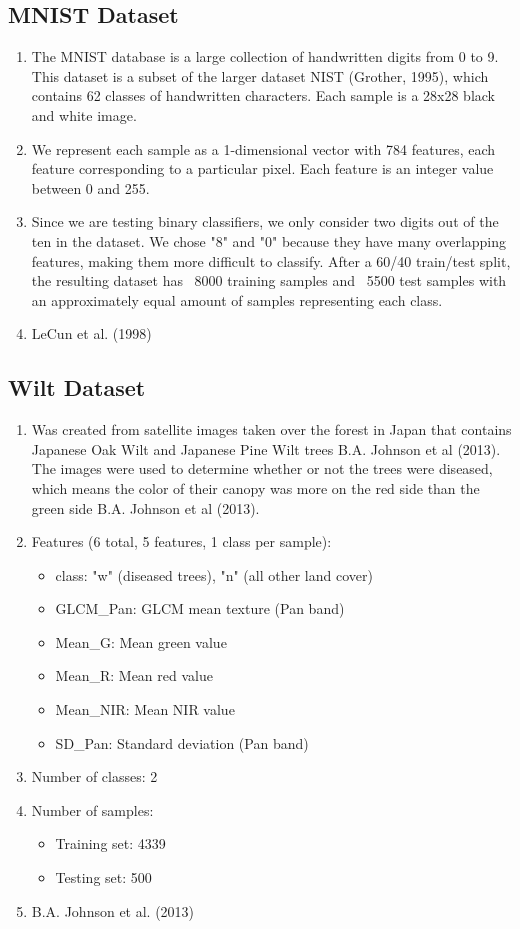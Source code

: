 \documentclass[letterpaper, 11pt]{article}
\begin{document}
\subsection{MNIST Dataset}
\begin{enumerate}
    \item The MNIST database is a large collection of handwritten digits from 0 to 9. This dataset is a subset of the larger dataset NIST (Grother, 1995), which contains 62 classes of handwritten characters. Each sample is a 28x28 black and white image.
    \item We represent each sample as a 1-dimensional vector with 784 features, each feature corresponding to a particular pixel. Each feature is an integer value between 0 and 255.
    \item Since we are testing binary classifiers, we only consider two digits out of the ten in the dataset. We chose "8" and "0" because they have many overlapping features, making them more difficult to classify. After a 60/40 train/test split, the resulting dataset has ~8000 training samples and ~5500 test samples with an approximately equal amount of samples representing each class.
    \item LeCun et al. (1998)
\end{enumerate}

\subsection{Wilt Dataset}
\begin{enumerate}
    \item Was created from  satellite images taken over the forest in Japan that contains Japanese Oak Wilt and Japanese Pine Wilt trees B.A. Johnson et al (2013). The images were used to determine whether or not the trees were diseased, which means the color of their canopy was more on the red side than the green side B.A. Johnson et al (2013).
    \item Features (6 total, 5 features, 1 class per sample):
    \begin{itemize}
        \item class: "w" (diseased trees), "n" (all other land cover)
        \item GLCM\_Pan: GLCM mean texture (Pan band)
        \item Mean\_G: Mean green value
        \item Mean\_R: Mean red value
        \item Mean\_NIR: Mean NIR value
        \item SD\_Pan: Standard deviation (Pan band)
    \end{itemize}
    \item Number of classes: 2
    \item Number of samples:
    \begin{itemize}
        \item Training set: 4339
        \item Testing set: 500
    \end{itemize}
    \item B.A. Johnson et al. (2013)
\end{enumerate}
\end{document}
